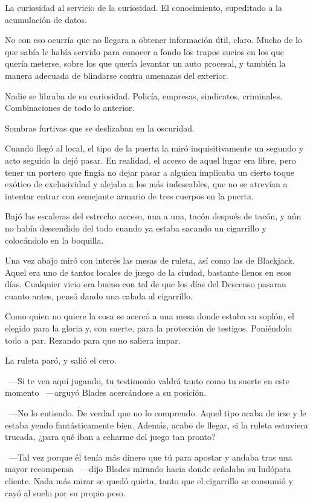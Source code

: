 La curiosidad al servicio de la curiosidad. El conocimiento, supeditado a la acumulación de datos.

No con eso ocurría que no llegara a obtener información útil, claro. Mucho de lo que sabía le había servido para conocer a fondo los trapos sucios en los que quería meterse, sobre los que quería levantar un auto procesal, y también la manera adecuada de blindarse contra amenazas del exterior.

Nadie se libraba de su curiosidad. Policía, empresas, sindicatos, criminales. Combinaciones de todo lo anterior.

Sombras furtivas que se deslizaban en la oscuridad.

Cuando llegó al local, el tipo de la puerta la miró inquisitivamente un segundo y acto seguido la dejó pasar. En realidad, el acceso de aquel lugar era libre, pero tener un portero que fingía no dejar pasar a alguien implicaba un cierto toque exótico de exclusividad y alejaba a los más indeseables, que no se atrevían a intentar entrar con semejante armario de tres cuerpos en la puerta.

Bajó las escaleras del estrecho acceso, una a una, tacón después de tacón, y aún no había descendido del todo cuando ya estaba sacando un cigarrillo y colocándolo en la boquilla.

Una vez abajo miró con interés las mesas de ruleta, así como las de Blackjack. Aquel era uno de tantos locales de juego de la ciudad, bastante llenos en esos días. Cualquier vicio era bueno con tal de que los días del Descenso pasaran cuanto antes, pensó dando una calada al cigarrillo.

Como quien no quiere la cosa se acercó a una mesa donde estaba su soplón, el elegido para la gloria y, con suerte, para la protección de testigos. Poniéndolo todo a par. Rezando para que no saliera impar.

La ruleta paró, y salió el cero.

~---Si te ven aquí jugando, tu testimonio valdrá tanto como tu suerte en este momento ~---arguyó Blades acercándose a su posición.
 
~---No lo entiendo. De verdad que no lo comprendo. Aquel tipo acaba de irse y le estaba yendo fantásticamente bien. Además, acabo de llegar, si la ruleta estuviera trucada, ¿para qué iban a echarme del juego tan pronto?

~---Tal vez porque él tenía más dinero que tú para apostar y andaba tras una mayor recompensa ~---dijo Blades mirando hacia donde señalaba su ludópata cliente. Nada más mirar se quedó quieta, tanto que el cigarrillo se consumió y cayó al suelo por su propio peso.

